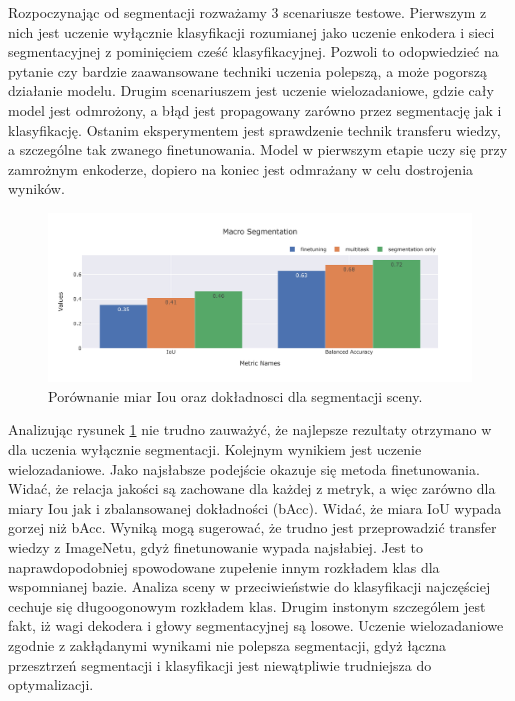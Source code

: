 \vspace{0.5cm}
Rozpoczynając od segmentacji rozważamy 3 scenariusze testowe. Pierwszym z nich jest uczenie wyłącznie klasyfikacji rozumianej jako uczenie enkodera i sieci segmentacyjnej z pominięciem cześć klasyfikacyjnej. Pozwoli to odopwiedzieć na pytanie czy bardzie zaawansowane techniki uczenia polepszą, a może pogorszą działanie modelu. Drugim scenariuszem jest uczenie wielozadaniowe, gdzie cały model jest odmrożony, a błąd jest propagowany zarówno przez segmentację jak i klasyfikację. Ostanim eksperymentem jest sprawdzenie technik transferu wiedzy, a szczególne tak zwanego finetunowania. Model w pierwszym etapie uczy się przy zamrożnym enkoderze, dopiero na koniec jest odmrażany w celu dostrojenia wyników. 

\begin{figure}[ht!]
    \centering
    \includegraphics[width=\textwidth]{result_imgs_sorted/Macro-Segmentation.jpeg}
    \caption{Porównanie miar Iou oraz dokładnosci dla segmentacji sceny.}
    \label{fig:macro-segmentation}
\end{figure}

Analizując rysunek \ref{fig:macro-segmentation} nie trudno zauważyć, że najlepsze rezultaty otrzymano w dla uczenia wyłącznie segmentacji. Kolejnym wynikiem jest uczenie wielozadaniowe. Jako najsłabsze podejście okazuje się metoda finetunowania. Widać, że relacja jakości są zachowane dla każdej z metryk, a więc zarówno dla miary Iou jak i zbalansowanej dokładności (bAcc). Widać, że miara IoU wypada gorzej niż bAcc. Wyniką mogą sugerować, że trudno jest przeprowadzić transfer wiedzy z ImageNetu, gdyż finetunowanie wypada najsłabiej. Jest to naprawdopodobniej spowodowane zupełenie innym rozkładem klas dla wspomnianej bazie. Analiza sceny w przeciwieństwie do klasyfikacji najczęściej cechuje się długoogonowym rozkładem klas. Drugim instonym szczególem jest fakt, iż wagi dekodera i głowy segmentacyjnej są losowe. Uczenie wielozadaniowe zgodnie z zakłądanymi wynikami nie polepsza segmentacji, gdyż łączna przesztrzeń segmentacji i klasyfikacji jest niewątpliwie trudniejsza do optymalizacji. 

